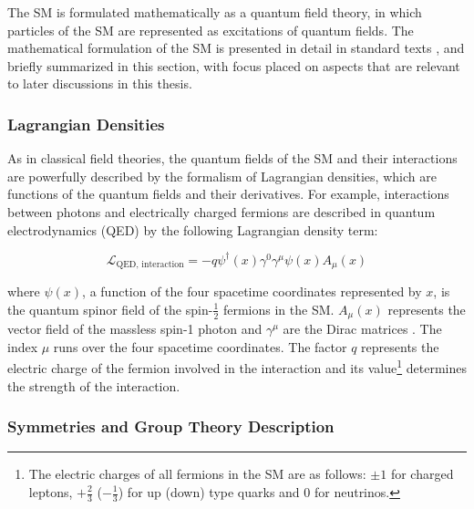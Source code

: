 The SM is formulated mathematically as a quantum field theory, in which particles of the SM are represented as excitations of quantum fields. The mathematical formulation of the SM is presented in detail in standard texts \cite{griffiths_2008, SM_intro}, and briefly summarized in this section, with focus placed on aspects that are relevant to later discussions in this thesis.

\subsubsection{Lagrangian Densities}

As in classical field theories, the quantum fields of the SM and their interactions are powerfully described by the formalism of Lagrangian densities, which are functions of the quantum fields and their derivatives. For example, interactions between photons and electrically charged fermions are described in quantum electrodynamics (QED) by the following Lagrangian density term:

\begin{equation}
\label{eq:qed_interaction}
\mathcal{L}_\text{QED, interaction} = -q\psi^\dagger(x)\gamma^0\gamma^\mu\psi(x) A_\mu(x)
\end{equation}

\noindent where \(\psi(x)\), a function of the four spacetime coordinates represented by \(x\), is the quantum spinor field of the spin-\(\frac{1}{2}\) fermions in the SM. \(A_\mu(x)\) represents the vector field of the massless spin-1 photon and \(\gamma^\mu\) are the Dirac matrices \cite{griffiths_2008}. The index \(\mu\) runs over the four spacetime coordinates. The factor \(q\) represents the electric charge of the fermion involved in the interaction and its value\footnote{The electric charges of all fermions in the SM are as follows: \(\pm1\) for charged leptons, \(+\frac{2}{3}\) (\(-\frac{1}{3}\)) for up (down) type quarks and 0 for neutrinos.} determines the strength of the interaction. 

\subsubsection{Symmetries and Group Theory Description}


